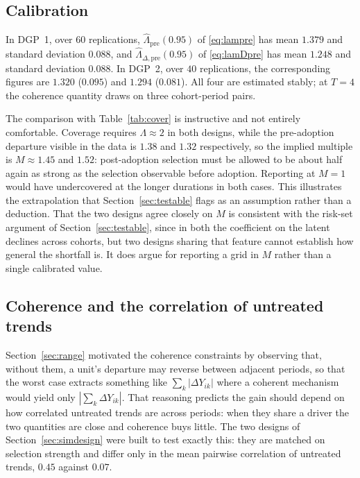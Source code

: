 \documentclass[12pt]{article}
\theoremstyle{remark}
\begin{document}
\subsection{Calibration}
\label{sec:simcal}

In DGP~1, over $60$ replications, $\widehat\Lambda_{\mathrm{pre}}(0.95)$ of
\eqref{eq:lampre} has mean $1.379$ and standard deviation $0.088$, and
$\widehat\Lambda_{\Delta,\mathrm{pre}}(0.95)$ of \eqref{eq:lamDpre} has mean
$1.248$ and standard deviation $0.088$. In DGP~2, over $40$ replications, the
corresponding figures are $1.320$ ($0.095$) and $1.294$ ($0.081$). All four are estimated
stably; at $T = 4$ the coherence quantity draws on three cohort-period pairs.

The comparison with Table~\ref{tab:cover} is instructive and not entirely comfortable.
Coverage requires $\Lambda \approx 2$ in both designs, while the pre-adoption departure
visible in the data is $1.38$ and $1.32$ respectively, so the implied multiple is
$M \approx 1.45$ and $1.52$: post-adoption selection must be allowed to be about half
again as strong as the selection observable before adoption. Reporting at $M = 1$ would
have undercovered at the longer durations in both cases. This illustrates the
extrapolation that Section~\ref{sec:testable} flags as an assumption rather than a
deduction. That the two designs agree closely on $M$ is consistent with the risk-set
argument of Section~\ref{sec:testable}, since in both the coefficient on the latent
declines across cohorts, but two designs sharing that feature cannot establish how general
the shortfall is. It does argue for reporting a grid in $M$ rather than a single
calibrated value.

\subsection{Coherence and the correlation of untreated trends}
\label{sec:simcoh}

Section~\ref{sec:range} motivated the coherence constraints by observing that, without
them, a unit's departure may reverse between adjacent periods, so that the worst case
extracts something like $\sum_k |\Delta Y_{ik}|$ where a coherent mechanism would yield
only $|\sum_k \Delta Y_{ik}|$. That reasoning predicts the gain should depend on how
correlated untreated trends are across periods: when they share a driver the two
quantities are close and coherence buys little. The two designs of
Section~\ref{sec:simdesign} were built to test exactly this: they are matched on selection
strength and differ only in the mean pairwise correlation of untreated trends, $0.45$
against $0.07$.
\end{document}
